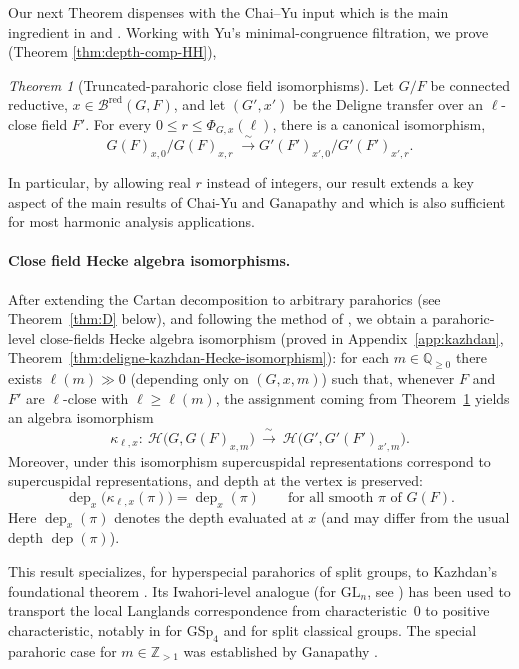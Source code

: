 \documentclass[american]{article}
\numberwithin{equation}{section}
\numberwithin{figure}{section}
\theoremstyle{plain}
\theoremstyle{definition}
\theoremstyle{remark}
\newcounter{thmA}
\newtheorem{theoremA}[thmA]{Theorem}
\DeclareMathOperator{\dep}{dep}
\newcommand{\cH}{\mathcal{H}}
\newcommand{\Q}{\mathbb{Q}}
\newcommand{\Z}{\mathbb{Z}}
\begin{document}
Our next Theorem dispenses with the Chai--Yu input which is the main ingredient in \cite{AV24} and \cite{ganapathy2019}.  Working with Yu's minimal-congruence filtration, we prove (Theorem \ref{thm:depth-comp-HH}),

\begin{theoremA}[Truncated-parahoric close field isomorphisms]\label{thm:C}
Let $G/F$ be connected reductive, $x\in\mathcal{B}^{\mathrm{red}}(G,F)$, and let
$(G',x')$ be the Deligne transfer over an $\ell$-close field $F'$.
For every $0\le r\le\Phi_{G,x}(\ell)$, there is a canonical isomorphism,
\[
   G(F)_{x,0}\big/\!G(F)_{x,r}
   \;\xrightarrow{\;\sim\;}
   G'(F')_{x',0}\big/\!G'(F')_{x',r}.
\]
\end{theoremA}
In particular, by allowing real \(r\) instead of integers, our result extends a key aspect of the main results of Chai-Yu \cite{ChaiYu2001} and Ganapathy \cite{ganapathy2019} and which is also sufficient for most harmonic analysis applications.

\smallskip
\paragraph{Close field Hecke algebra isomorphisms.}
After extending the Cartan decomposition to arbitrary parahorics (see Theorem~\ref{thm:D} below),
and following the method of \cite{ganapathy2019}, we obtain a parahoric-level close-fields
Hecke algebra isomorphism (proved in Appendix~\ref{app:kazhdan}, Theorem~\ref{thm:deligne-kazhdan-Hecke-isomorphism}):
for each $m\in\Q_{\ge 0}$ there exists $\ell(m)\gg 0$ (depending only on $(G,x,m)$) such that,
whenever $F$ and $F'$ are $\ell$-close with $\ell\ge \ell(m)$, the assignment coming from
Theorem~\ref{thm:C} yields an algebra isomorphism
\[
\kappa_{\ell,x}:\ \cH\!\bigl(G,G(F)_{x,m}\bigr)\ \xrightarrow{\ \sim\ }\ \cH\!\bigl(G',G'(F')_{x',m}\bigr).
\]
Moreover, under this isomorphism supercuspidal representations correspond to supercuspidal
representations, and depth at the vertex is preserved:
\[
\dep_x\!\bigl(\kappa_{\ell,x}(\pi)\bigr)=\dep_x(\pi)\qquad\text{for all smooth $\pi$ of $G(F)$.}
\]
Here $\dep_x(\pi)$ denotes the depth evaluated at $x$ (and may differ from the usual depth $\dep(\pi)$).

This result specializes, for hyperspecial parahorics of split groups, to Kazhdan's foundational
theorem \cite{kazhdan1986}. Its Iwahori-level analogue (for $\mathrm{GL}_n$, see \cite{Lem01}) has been used
to transport the local Langlands correspondence from characteristic~$0$ to positive characteristic,
notably in \cite{Gan2015} for $\mathrm{GSp}_4$ and \cite{GanVar17} for split classical groups. The special
parahoric case for $m\in\Z_{>1}$ was established by Ganapathy \cite{ganapathy2022}.
\end{document}

